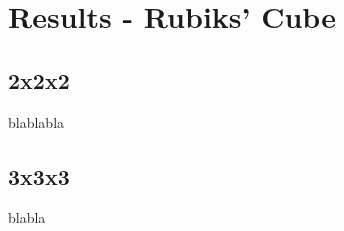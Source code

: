 
\chapter{Results - Rubiks' Cube} %

\label{Chapter5} %


\section{2x2x2}

blablabla

\section{3x3x3}

blabla
